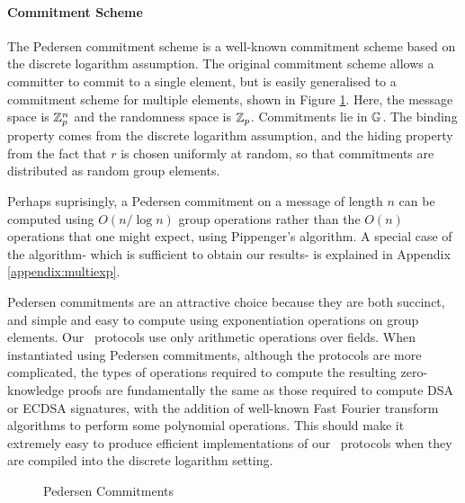 \paragraph{Commitment Scheme} The Pedersen commitment scheme \cite{Pedersen91} is a well-known commitment scheme based on the discrete logarithm assumption. The original commitment scheme allows a committer to commit to a single element, but is easily generalised to a commitment scheme for multiple elements, shown in Figure \ref{alg:com:pedersen}. Here, the message space is $\mathbb{Z}_p^n$ and the randomness space is $\mathbb{Z}_p$. Commitments lie in $\mathbb{G}$. The binding property comes from the discrete logarithm assumption, and the hiding property from the fact that $r$ is chosen uniformly at random, so that commitments are distributed as random group elements.

Perhaps suprisingly, a Pedersen commitment on a message of length $n$ can be computed using $O(n / \log n)$ group operations rather than the $O(n)$ operations that one might expect, using Pippenger's algorithm. A special case of the algorithm- which is sufficient to obtain our results- is explained in Appendix \ref{appendix:multiexp}.

Pedersen commitments are an attractive choice because they are both succinct, and simple and easy to compute using exponentiation operations on group elements. Our \ILC\ protocols use only arithmetic operations over fields. When instantiated using Pedersen commitments, although the protocols are more complicated, the types of operations required to compute the resulting zero-knowledge proofs are fundamentally the same as those required to compute DSA or ECDSA signatures, with the addition of well-known Fast Fourier transform algorithms to perform some polynomial operations. This should make it extremely easy to produce efficient implementations of our \ILC\ protocols when they are compiled into the discrete logarithm setting.

\begin{figure}[t]
  \caption{Pedersen Commitments}
\label{alg:com:pedersen}
\end{figure}

